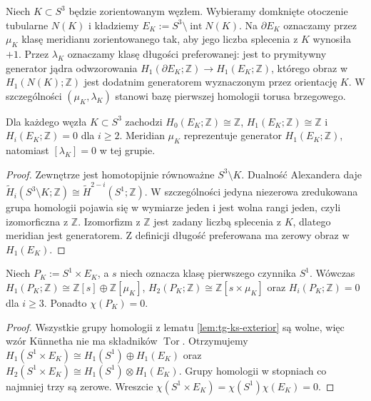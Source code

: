 \begin{definicja}
Niech $K\subset S^3$ będzie zorientowanym węzłem.
Wybieramy domknięte otoczenie tubularne $N(K)$ i kładziemy
$E_K:=S^3\setminus\operatorname{int}N(K)$.
Na $\partial E_K$ oznaczamy przez $\mu_K$ klasę
meridianu zorientowanego tak, aby jego liczba
splecenia z $K$ wynosiła $+1$. Przez $\lambda_K$
oznaczamy klasę długości preferowanej: jest to
prymitywny generator jądra odwzorowania
$H_1(\partial E_K;\mathbb Z)\to H_1(E_K;\mathbb Z)$,
którego obraz w $H_1(N(K);\mathbb Z)$ jest
dodatnim generatorem wyznaczonym przez orientację $K$.
W szczególności $(\mu_K,\lambda_K)$ stanowi bazę
pierwszej homologii torusa brzegowego.
\end{definicja}

\begin{lemat}
\label{lem:tg-ks-exterior}
Dla każdego węzła $K\subset S^3$ zachodzi
$H_0(E_K;\mathbb Z)\cong\mathbb Z$,
$H_1(E_K;\mathbb Z)\cong\mathbb Z$ i
$H_i(E_K;\mathbb Z)=0$ dla $i\ge2$.
Meridian $\mu_K$ reprezentuje generator $H_1(E_K;\mathbb Z)$,
natomiast $[\lambda_K]=0$ w tej grupie.
\end{lemat}

\begin{proof}
Zewnętrze jest homotopijnie równoważne $S^3\setminus K$.
Dualność Alexandera daje
$\widetilde H_i(S^3\setminus K;\mathbb Z)
\cong\widetilde H^{2-i}(S^1;\mathbb Z)$.
W szczególności jedyna niezerowa zredukowana grupa
homologii pojawia się w wymiarze jeden i jest wolna
rangi jeden, czyli izomorficzna z $\mathbb Z$.
Izomorfizm z $\mathbb Z$ jest zadany liczbą splecenia
z $K$, dlatego meridian jest generatorem. Z definicji
długość preferowana ma zerowy obraz w $H_1(E_K)$.
\end{proof}

\begin{wniosek}
\label{cor:tg-ks-piece}
Niech $P_K:=S^1\times E_K$, a $s$ niech oznacza
klasę pierwszego czynnika $S^1$. Wówczas
$H_1(P_K;\mathbb Z)\cong\mathbb Z[s]\oplus\mathbb Z[\mu_K]$,
$H_2(P_K;\mathbb Z)\cong\mathbb Z[s\times\mu_K]$
oraz $H_i(P_K;\mathbb Z)=0$ dla $i\ge3$.
Ponadto $\chi(P_K)=0$.
\end{wniosek}

\begin{proof}
Wszystkie grupy homologii z lematu
\ref{lem:tg-ks-exterior} są wolne, więc wzór Künnetha
nie ma składników $\operatorname{Tor}$. Otrzymujemy
$H_1(S^1\times E_K)\cong H_1(S^1)\oplus H_1(E_K)$
oraz $H_2(S^1\times E_K)\cong H_1(S^1)\otimes H_1(E_K)$.
Grupy homologii w stopniach co najmniej trzy są zerowe.
Wreszcie $\chi(S^1\times E_K)=\chi(S^1)\chi(E_K)=0$.
\end{proof}

